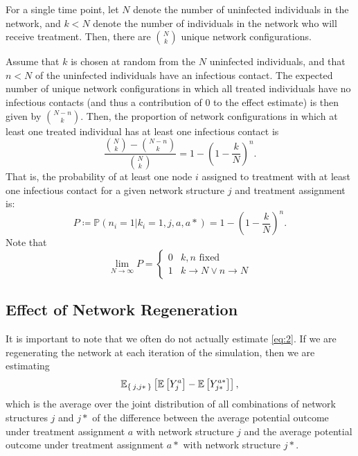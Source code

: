 \documentclass{article}
\theoremstyle{definition}
\begin{document}
For a single time point, let $N$ denote the number of uninfected individuals in the network, and $k <N$ denote the number of individuals in the network who will receive treatment. Then, there are $N \choose k$ unique network configurations.

Assume that $k$ is chosen at random from the $N$ uninfected individuals, and that $n<N$ of the uninfected individuals have an infectious contact. The expected number of unique network configurations  in which all treated individuals have no infectious contacts (and thus a contribution of 0 to the effect estimate) is then given by $N-n\choose k$. Then, the proportion of network configurations in which at least one treated individual has at least one infectious contact is 
\begin{equation}\label{eq:4}
    \frac{{N \choose k}-{N-n \choose k}}{{N \choose k}}=1-\left(1-\frac{k}{N}\right)^{n}.
\end{equation}
That is, the probability of at least one node $i$ assigned to treatment with at least one infectious contact for a given network structure $j$ and treatment assignment is:
\begin{equation}\label{eq:5}
    P \coloneqq \mathbb{P}\left(n_{i}=1 \vert k_{i}=1,j,a,a*\right)=1-\left(1-\frac{k}{N}\right)^{n}.
\end{equation}
Note that 
\begin{equation}\label{eq:6}
    \lim_{N \to \infty}P=\begin{cases}0 & k,n \text{ fixed} \\ 1 & k \to N \lor n \to N  \end{cases}
\end{equation}

\subsection{Effect of Network Regeneration}
It is important to note that we often do not actually estimate \ref{eq:2}. If we are regenerating the network at each iteration of the simulation, then we are estimating \begin{equation}\label{eq:8}
    \mathbb{E}_{\Set{j,j*}}\left[\mathbb{E}\left[Y_{j}^{a}\right]-\mathbb{E}\left[Y_{j*}^{a*}\right]\right],
\end{equation} 
which is the average over the joint distribution of all combinations of network structures $j$ and $j*$ of the difference between the average potential outcome under treatment assignment $a$ with network structure $j$ and the average potential outcome under  treatment assignment $a*$ with network structure $j*$.
\end{document}
